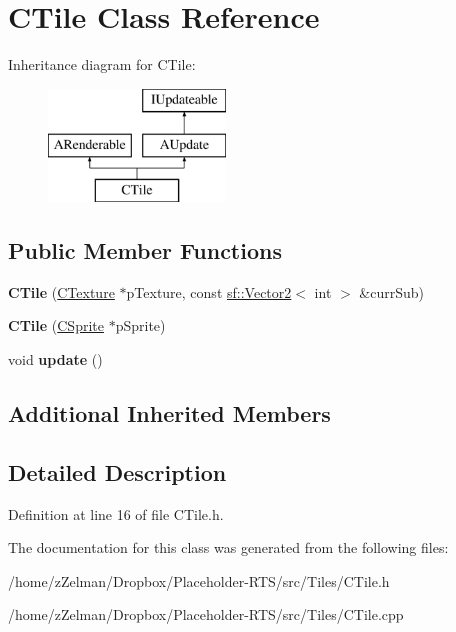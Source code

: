 \hypertarget{classCTile}{\section{C\-Tile Class Reference}
\label{classCTile}
}
Inheritance diagram for C\-Tile\-:\begin{figure}[H]
\begin{center}
\leavevmode
\includegraphics[height=3.000000cm]{classCTile}
\end{center}
\end{figure}
\subsection*{Public Member Functions}
\begin{DoxyCompactItemize}
\item 
\hypertarget{classCTile_a030eef2d18fb054c0fa6738784af0b0d}{{\bfseries C\-Tile} (\hyperlink{classCTexture}{C\-Texture} $\ast$p\-Texture, const \hyperlink{classsf_1_1Vector2}{sf\-::\-Vector2}$<$ int $>$ \&curr\-Sub)}\label{classCTile_a030eef2d18fb054c0fa6738784af0b0d}

\item 
\hypertarget{classCTile_a07c38be9c331480eb7c8d526b084a287}{{\bfseries C\-Tile} (\hyperlink{classCSprite}{C\-Sprite} $\ast$p\-Sprite)}\label{classCTile_a07c38be9c331480eb7c8d526b084a287}

\item 
\hypertarget{classCTile_a818a17e48a7219eedac950b82c641ee0}{void {\bfseries update} ()}\label{classCTile_a818a17e48a7219eedac950b82c641ee0}

\end{DoxyCompactItemize}
\subsection*{Additional Inherited Members}


\subsection{Detailed Description}


Definition at line 16 of file C\-Tile.\-h.



The documentation for this class was generated from the following files\-:\begin{DoxyCompactItemize}
\item 
/home/z\-Zelman/\-Dropbox/\-Placeholder-\/\-R\-T\-S/src/\-Tiles/C\-Tile.\-h\item 
/home/z\-Zelman/\-Dropbox/\-Placeholder-\/\-R\-T\-S/src/\-Tiles/C\-Tile.\-cpp\end{DoxyCompactItemize}
